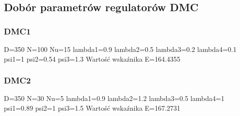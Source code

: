 %     

\subsection{Dobór parametrów regulatorów DMC}


\subsubsection{DMC1}
D=350 N=100 Nu=15 lambda1=0.9 lambda2=0.5 lambda3=0.2 lambda4=0.1
psi1=1 psi2=0.54 psi3=1.3
Wartość wskaźnika E=164.4355

%     

%     

\subsubsection{DMC2}
D=350 N=30 Nu=5 lambda1=0.9 lambda2=1.2 lambda3=0.5 lambda4=1
psi1=0.89 psi2=1 psi3=1.5
Wartość wskaźnika E=167.2731

%     

%     

